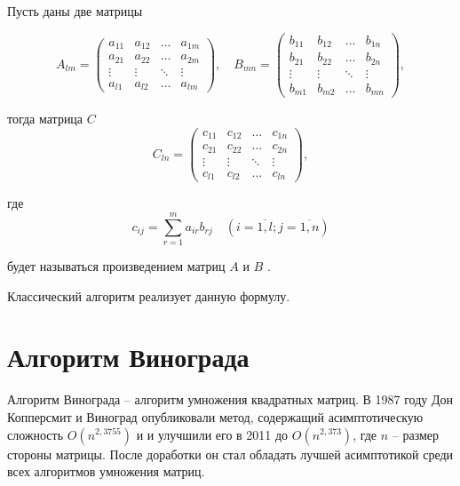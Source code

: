Пусть даны две матрицы

\begin{equation}
	A_{lm} = \begin{pmatrix}
		a_{11} & a_{12} & \ldots & a_{1m}\\
		a_{21} & a_{22} & \ldots & a_{2m}\\
		\vdots & \vdots & \ddots & \vdots\\
		a_{l1} & a_{l2} & \ldots & a_{lm}
	\end{pmatrix},
	\quad
	B_{mn} = \begin{pmatrix}
		b_{11} & b_{12} & \ldots & b_{1n}\\
		b_{21} & b_{22} & \ldots & b_{2n}\\
		\vdots & \vdots & \ddots & \vdots\\
		b_{m1} & b_{m2} & \ldots & b_{mn}
	\end{pmatrix},
\end{equation}

тогда матрица $C$
\begin{equation}
	C_{ln} = \begin{pmatrix}
		c_{11} & c_{12} & \ldots & c_{1n}\\
		c_{21} & c_{22} & \ldots & c_{2n}\\
		\vdots & \vdots & \ddots & \vdots\\
		c_{l1} & c_{l2} & \ldots & c_{ln}
	\end{pmatrix},
\end{equation}

где
\begin{equation}
	\label{eq:M}
	c_{ij} =
	\sum_{r=1}^{m} a_{ir}b_{rj} \quad (i=\overline{1,l}; j=\overline{1,n})
\end{equation}

будет называться произведением матриц $A$ и $B$ \cite{book_matrix}.

Классический алгоритм реализует данную формулу.

\section{Алгоритм Винограда}

Алгоритм Винограда \cite{book_vinograd} – алгоритм умножения квадратных матриц.
В 1987 году Дон Копперсмит и Виноград опубликовали метод, содержащий асимптотическую сложность $O(n^{2,3755})$ и и улучшили его в 2011 до $O(n^{2,373})$, где $n$ -- размер стороны матрицы. После доработки он стал обладать лучшей асимптотикой среди всех алгоритмов умножения матриц.


